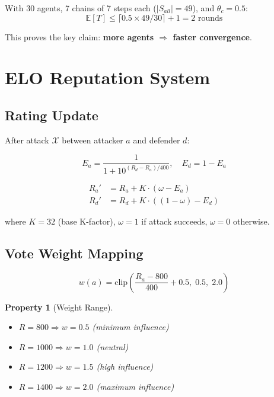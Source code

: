 \documentclass[11pt,a4paper]{article}
\newtheorem{property}{Property}
\begin{document}
\begin{corollary}
With 30 agents, 7 chains of 7 steps each ($|S_{all}| = 49$), and $\theta_c = 0.5$:
$$\mathbb{E}[T] \leq \lceil 0.5 \times 49 / 30 \rceil + 1 = 2 \text{ rounds}$$
\end{corollary}

This proves the key claim: \textbf{more agents $\Rightarrow$ faster convergence}.

\section{ELO Reputation System}

\subsection{Rating Update}

After attack $\mathcal{X}$ between attacker $a$ and defender $d$:

$$E_a = \frac{1}{1 + 10^{(R_d - R_a)/400}}, \quad E_d = 1 - E_a$$

\begin{align}
R_a' &= R_a + K \cdot (\omega - E_a) \\
R_d' &= R_d + K \cdot ((1-\omega) - E_d)
\end{align}

where $K = 32$ (base K-factor), $\omega = 1$ if attack succeeds, $\omega = 0$ otherwise.

\subsection{Vote Weight Mapping}

$$w(a) = \text{clip}\left(\frac{R_a - 800}{400} + 0.5, \; 0.5, \; 2.0\right)$$

\begin{property}[Weight Range]
\begin{itemize}
    \item $R = 800 \Rightarrow w = 0.5$ (minimum influence)
    \item $R = 1000 \Rightarrow w = 1.0$ (neutral)
    \item $R = 1200 \Rightarrow w = 1.5$ (high influence)
    \item $R = 1400 \Rightarrow w = 2.0$ (maximum influence)
\end{itemize}
\end{property}
\end{document}
